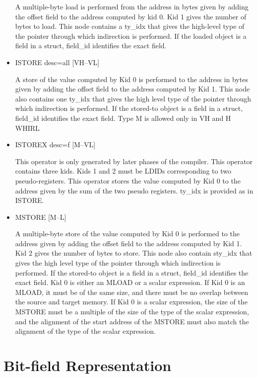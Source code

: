 \begin{itemize}
A multiple-byte load is performed from the address in bytes given
by adding the offset field to the address computed by kid 0. Kid 1
gives the number of bytes to load. This node contains a ty\_idx that gives the
high-level type of the pointer through which indirection is performed.
If the loaded object is a field in a struct, field\_id identifies
the exact field. 

\item
{}%
ISTORE desc=all \hfill [VH--VL]

A store of the value computed by Kid 0 is performed to the address
in bytes given by adding the offset field to the address computed
by Kid 1.
This node also contains one ty\_idx that gives the high level type
of the pointer through which indirection is performed. If the
stored-to object is a field in a struct, field\_id identifies the
exact field. Type M is allowed only in VH and H WHIRL

\item
{}%
ISTOREX desc=f \hfill [M--VL]

This operator is only generated by later phases of the compiler.
This operator contains three kids. Kids 1 and 2 must be
%
LDIDs corresponding to two pseudo-registers. This operator stores
the value computed by Kid 0
to the address given by the sum of the two pseudo registers. ty\_idx
is provided as in
%
ISTORE.

\item
{}%
MSTORE \hfill [M--L]

A multiple-byte store of the value computed by Kid 0 is performed
to the address given by adding the offset field to the address
computed by Kid
1. Kid 2 gives the number of bytes to store. This node also
contain sty\_idx that gives the high level type of the pointer through
which indirection is performed. If the stored-to object is a field
in a struct, field\_id identifies the exact field. Kid 0 is either
an
%
MLOAD or a scalar expression. If Kid 0 is an
%
MLOAD, it must be of
the same size, and there must be no overlap between the source and
target memory. If Kid 0 is a scalar expression, the size of the
%
MSTORE must be a multiple of the size of the type of the scalar
expression, and the alignment of the start address of the
%
MSTORE
must also match the alignment of the type of the scalar expression.

\end{itemize}
\section{Bit-field Representation}

